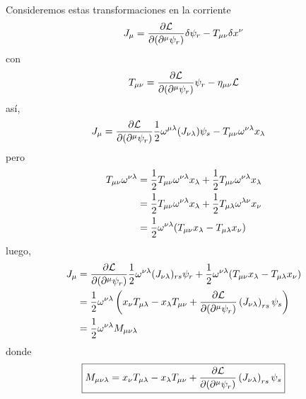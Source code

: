 Consideremos estas transformaciones en la corriente
\begin{equation}
  J_\mu =\pdv{\mathcal{L}}{(\partial^\mu\psi_r)}\delta\psi_r-T_{\mu\nu}\delta x^\nu 
\end{equation}
con
\begin{equation}
  T_{\mu\nu }=\pdv{\mathcal{L}}{(\partial^\mu\psi_r)}\psi_r-\eta_{\mu\nu }\mathcal{L} 
\end{equation}
así,
\begin{align}
  J_\mu &=\pdv{\mathcal{L}}{(\partial^\mu\psi_r)}\frac{1}{2}\omega^{\mu\lambda}(J_{\nu\lambda})\psi_s-T_{\mu\nu }\omega^{\nu\lambda}x_\lambda
\end{align}
pero
\begin{align}
  T_{\mu\nu }\omega^{\nu\lambda}&=\frac{1}{2}T_{\mu\nu }\omega^{\nu\lambda}x_\lambda +\frac{1}{2}T_{\mu\nu }\omega^{\nu\lambda}x_\lambda\\
  &=\frac{1}{2}T_{\mu\nu }\omega^{\nu\lambda}x_\lambda +\frac{1}{2}T_{\mu\lambda }\omega^{\lambda\nu }x_\nu \\
  &=\frac{1}{2}\omega^{\nu\lambda}(T_{\mu\nu }x_\lambda-T_{\mu\lambda}x_\nu )
\end{align}
luego,
\begin{align}
  J_\mu &=\pdv{\mathcal{L}}{(\partial^\mu\psi_r)}\frac{1}{2}\omega^{\nu\lambda}(J_{\nu\lambda})_{rs}\psi_r+\frac{1}{2}\omega^{\nu\lambda}(T_{\mu\nu }x_\lambda-T_{\mu\lambda}x_\nu )\\
  &=\frac{1}{2}\omega^{\nu\lambda}\left(x_\nu T_{\mu\lambda}-x_\lambda T_{\mu\nu }+\pdv{\mathcal{L}}{(\partial^\mu\psi_r)}\left(J_{\nu\lambda}\right)_{rs}\psi_s\right)\\
  &=\frac{1}{2}\omega^{\nu\lambda}M_{\mu\nu\lambda}
\end{align}
donde
\begin{equation}
 \boxed{ M_{\mu\nu\lambda}=x_\nu T_{\mu\lambda}-x_\lambda T_{\mu\nu }+\pdv{\mathcal{L}}{(\partial^\mu\psi_r)}\left(J_{\nu\lambda}\right)_{rs}\psi_s}
\end{equation}

